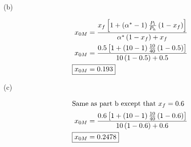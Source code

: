 (b)

\begin{align*}
    x_{0M} &= \frac{x_f \left[1 + \left(\alpha^*-1\right)\frac{P_l}{P_h}\left(1-x_f\right)\right]}{\alpha^*\left(1-x_f\right)+x_f} \\
    x_{0M} &= \frac{0.5 \left[1 + \left(10-1\right)\frac{10}{40}\left(1-0.5\right)\right]}{10\left(1-0.5\right)+0.5} \\
    \Aboxed{x_{0M} &= 0.193}
\end{align*}

(c)

\begin{align*}
    \intertext{Same as part b except that $x_f=0.6$}
    x_{0M} &= \frac{0.6 \left[1 + \left(10-1\right)\frac{10}{40}\left(1-0.6\right)\right]}{10\left(1-0.6\right)+0.6} \\
    \Aboxed{x_{0M} &= 0.2478}
\end{align*}